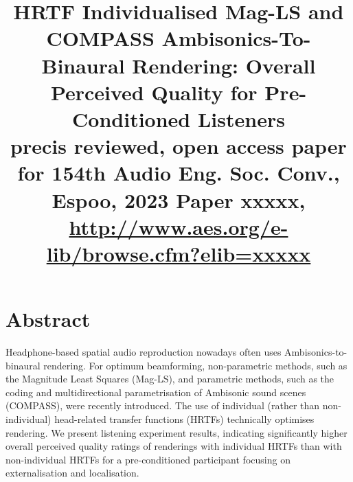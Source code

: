 \documentclass[conference]{IEEEtran}
\begin{document}
\title{HRTF Individualised Mag-LS and COMPASS Ambisonics-To-Binaural Rendering:
Overall Perceived Quality for Pre-Conditioned Listeners\\
{\footnotesize precis reviewed, open access paper for 154th
Audio Eng. Soc. Conv., Espoo, 2023
Paper xxxxx, \url{http://www.aes.org/e-lib/browse.cfm?elib=xxxxx}}}
\author{
}
\maketitle

\section*{Abstract}
Headphone-based spatial audio reproduction nowadays often uses Ambisonics-to-binaural rendering.
%
For optimum beamforming, non-parametric methods, such as the Magnitude Least Squares (Mag-LS), and parametric methods, such as the coding and multidirectional parametrisation of Ambisonic sound scenes (COMPASS), were recently introduced.
%
The use of individual (rather than non-individual) head-related transfer functions (HRTFs) technically optimises rendering.
%
We present listening experiment results, indicating significantly higher overall perceived quality ratings of renderings with individual HRTFs than with non-individual HRTFs for a pre-conditioned participant focusing on externalisation and localisation.
\end{document}

